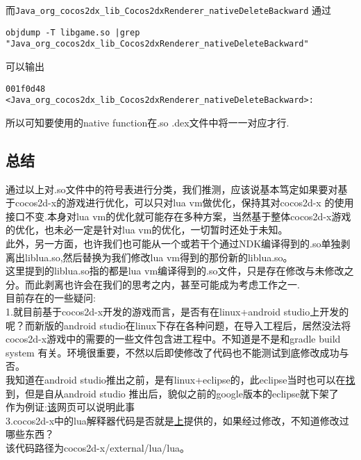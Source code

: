 而\verb|Java_org_cocos2dx_lib_Cocos2dxRenderer_nativeDeleteBackward|
通过\\
\begin{lstlisting}
objdump -T libgame.so |grep "Java_org_cocos2dx_lib_Cocos2dxRenderer_nativeDeleteBackward"
\end{lstlisting}

可以输出
\begin{lstlisting}
001f0d48 <Java_org_cocos2dx_lib_Cocos2dxRenderer_nativeDeleteBackward>:
\end{lstlisting}
所以可知要使用的native function在.so .dex文件中将一一对应才行.\\


\subsection{总结}
通过以上对.so文件中的符号表进行分类，我们推测，应该说基本笃定如果要对基于cocos2d-x的游戏进行优化，可以只对lua vm做优化，保持其对cocos2d-x
的使用接口不变.本身对lua vm的优化就可能存在多种方案，当然基于整体cocos2d-x游戏的优化，也未必一定是针对lua vm的优化，一切暂时还处于未知。\\

此外，另一方面，也许我们也可能从一个或若干个通过NDK编译得到的.so单独剥离出liblua.so,然后替换为我们修改lua vm得到的那份新的liblua.so。\\
这里提到的liblua.so指的都是lua vm编译得到的.so文件，只是存在修改与未修改之分。而此剥离也许会在我们的思考之内，甚至可能成为考虑工作之一.\\

目前存在的一些疑问:\\
1.就目前基于cocos2d-x开发的游戏而言，是否有在linux+android studio上开发的呢？而新版的android studio在linux下存在各种问题，在导入工程后，居然没法将cocos2d-x游戏中的需要的一些文件包含进工程中。不知道是不是和gradle build system 有关。环境很重要，不然以后即使修改了代码也不能测试到底修改成功与否。\\
    我知道在android studio推出之前，是有linux+eclipse的，此eclipse当时也可以在\href{http://developer.android.com/sdk/index.html#Other} 找到，但是自从android studio 推出后，貌似之前的google版本的eclipse就下架了\\
作为例证:\href{http://www.cnblogs.com/lonkiss/archive/2012/11/17/2775440.html} 该网页可以说明此事\\


3.cocos2d-x中的lua解释器代码是否就是\href{http://www.lua.org/download.html}上提供的，如果经过修改，不知道修改过哪些东西？\\
该代码路径为cocos2d-x/external/lua/lua。













